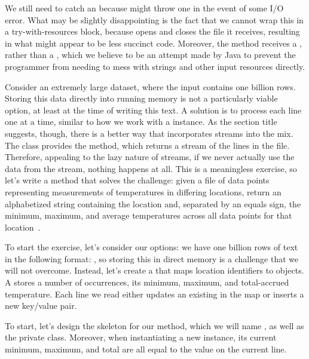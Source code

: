 We still need to catch an  because  might throw one in the event of some I/O error. 
What may be slightly disappointing is the fact that we cannot wrap this in a try-with-resources block, because  opens and closes the file it receives, resulting in what might appear to be less succinct code. 
Moreover, the method receives a , rather than a , which we believe to be an attempt made by Java to prevent the programmer from needing to mess with strings and other input resources directly. 

Consider an extremely large dataset, where the input contains one billion rows. Storing this data directly into running memory is not a particularly viable option, at least at the time of writing this text. 
A solution is to process each line one at a time, similar to how we work with a  instance. 
As the section title suggests, though, there is a better way that incorporates streams into the mix. 
The  class provides the  method, which returns a stream of the lines in the file. 
Therefore, appealing to the lazy nature of streams, if we never actually use the data from the stream, nothing happens at all. 
This is a meaningless exercise, so let's write a method that solves the  challenge: given a file of data points representing measurements of temperatures in differing locations, return an alphabetized string containing the location and, separated by an equals sign, the minimum, maximum, and average temperatures across all data points for that location~.

To start the exercise, let's consider our options: we have one billion rows of text in the following format: , so storing this in direct memory is a challenge that we will not overcome. 
Instead, let's create a  that maps location identifiers to  objects. 
A  stores a number of occurrences, its minimum, maximum, and total-accrued temperature. 
Each line we read either updates an existing  in the map or inserts a new key/value pair.

To start, let's design the skeleton for our method, which we will name , as well as the  private class. 
Moreover, when instantiating a new  instance, its current minimum, maximum, and total are all equal to the value on the current line.

